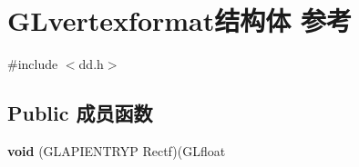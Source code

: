 \hypertarget{struct_g_lvertexformat}{}\section{G\+Lvertexformat结构体 参考}
\label{struct_g_lvertexformat}


{\ttfamily \#include $<$dd.\+h$>$}

\subsection*{Public 成员函数}
\begin{DoxyCompactItemize}
\item 
\mbox{\label{struct_g_lvertexformat_acf55053438fb35ef55e7bb53afade545}} 
{\bfseries void} (G\+L\+A\+P\+I\+E\+N\+T\+R\+YP Rectf)(G\+Lfloat
\end{DoxyCompactItemize}
